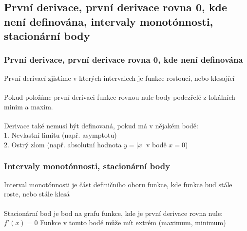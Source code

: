 \subsection{První derivace, první derivace rovna 0, kde není definována, intervaly monotónnosti, stacionární body}
\subsubsection{První derivace, první derivace rovna 0, kde není definována}
První derivací zjistíme v kterých intervalech je funkce rostoucí, nebo klesající\\ \\
Pokud položíme první derivaci funkce rovnou nule body podezřelé z lokálních minim a maxim. \\ \\
Derivace také nemusí být definovaná, pokud má v nějakém bodě: \\
1. Nevlastní limitu (např. asymptotu) \\ 
2. Ostrý zlom (např. absolutní hodnota $y=|x|$ v bodě $x=0$)

\subsubsection{Intervaly monotónnosti, stacionární body}
Interval monotónnosti je část definičního oboru funkce, kde funkce buď stále roste, nebo stále klesá\\ \\
Stacionární bod je bod na grafu funkce, kde je první derivace rovna nule: $f'(x) = 0$ Funkce v tomto bodě může mít extrém (maximum, minimum)

